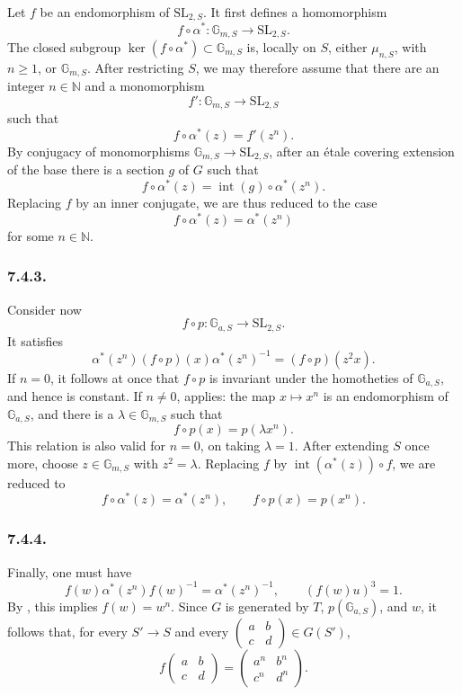 Let \(f\) be an endomorphism of \(\mathrm{SL}_{2,S}\). It first
defines a homomorphism
\[
  f\circ\alpha^*:\mathbb G_{m,S}\longrightarrow\mathrm{SL}_{2,S}.
\]
The closed subgroup
\(\ker(f\circ\alpha^*)\subset\mathbb G_{m,S}\) is, locally on \(S\),
either \(\mu_{n,S}\), with \(n\geq1\), or
\(\mathbb G_{m,S}\). After restricting \(S\), we may therefore assume
that there are an integer \(n\in\mathbb N\) and a monomorphism
\[
  f':\mathbb G_{m,S}\longrightarrow\mathrm{SL}_{2,S}
\]
such that
\[
  f\circ\alpha^*(z)=f'(z^n).
\]
By conjugacy of monomorphisms
\(\mathbb G_{m,S}\to\mathrm{SL}_{2,S}\), after an étale covering
extension of the base there is a section \(g\) of \(G\) such that
\[
  f\circ\alpha^*(z)
  =
  \operatorname{int}(g)\circ\alpha^*(z^n).
\]
Replacing \(f\) by an inner conjugate, we are thus reduced to the case
\[
  f\circ\alpha^*(z)=\alpha^*(z^n)
\]
for some \(n\in\mathbb N\).

\subsubsection*{7.4.3.}

Consider now
\[
  f\circ p:\mathbb G_{a,S}\longrightarrow\mathrm{SL}_{2,S}.
\]
It satisfies
\[
  \alpha^*(z^n)(f\circ p)(x)\alpha^*(z^n)^{-1}
  =
  (f\circ p)(z^2x).
\]
If \(n=0\), it follows at once that \(f\circ p\) is invariant under
the homotheties of \(\mathbb G_{a,S}\), and hence is constant. If
\(n\neq0\),  applies: the map
\(x\mapsto x^n\) is an endomorphism of \(\mathbb G_{a,S}\), and there
is a \(\lambda\in\mathbb G_{m,S}\) such that
\[
  f\circ p(x)=p(\lambda x^n).
\]
This relation is also valid for \(n=0\), on taking \(\lambda=1\).
After extending \(S\) once more, choose
\(z\in\mathbb G_{m,S}\) with \(z^2=\lambda\). Replacing \(f\) by
\(\operatorname{int}(\alpha^*(z))\circ f\), we are reduced to
\[
  f\circ\alpha^*(z)=\alpha^*(z^n),
  \qquad
  f\circ p(x)=p(x^n).
\]

\subsubsection*{7.4.4.}

Finally, one must have
\[
  f(w)\alpha^*(z^n)f(w)^{-1}=\alpha^*(z^n)^{-1},
  \qquad
  (f(w)u)^3=1.
\]
By , this implies \(f(w)=w^n\). Since \(G\) is generated
by \(T\), \(p(\mathbb G_{a,S})\), and \(w\), it follows that, for every
\(S'\to S\) and every
\(\begin{pmatrix}a&b\\c&d\end{pmatrix}\in G(S')\),
\[
  f\!\begin{pmatrix}a&b\\c&d\end{pmatrix}
  =
  \begin{pmatrix}a^n&b^n\\c^n&d^n\end{pmatrix}.
\]

